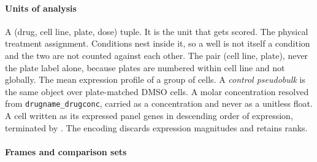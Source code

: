 \paragraph{Units of analysis}

\begin{description}[leftmargin=1em, itemsep=0.5ex,
                    font=\normalfont\bfseries]
 A (drug, cell line, plate, dose) tuple. It is the
  unit that gets scored.
 The physical treatment assignment. Conditions
  nest inside it, so a well is not itself a condition and the two are not
  counted against each other.
 The pair (cell line, plate), never the plate
  label alone, because plates are numbered within cell line and not globally.
 The mean expression profile of a group of
  cells. A \emph{control pseudobulk} is the same object over plate-matched DMSO
  cells.
 A molar concentration resolved from
  \texttt{drugname\_drugconc}, carried as a concentration and never as a
  unitless float.
 A cell written as its expressed panel
  genes in descending order of expression, terminated by \ENDCELL. The encoding
  discards expression magnitudes and retains ranks.
\end{description}

\paragraph{Frames and comparison sets}

